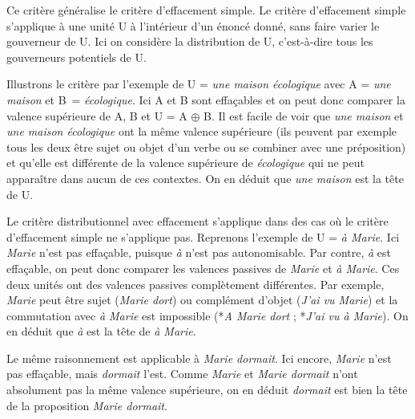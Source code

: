 Ce critère généralise le critère d’effacement simple. Le critère d’effacement simple s’applique à une unité U à l’intérieur d’un énoncé donné, sans faire varier le gouverneur de U. Ici on considère la distribution de U, c’est-à-dire tous les gouverneurs potentiels de U.

Illustrons le critère par l’exemple de U = \textit{une maison écologique} avec A = \textit{une maison} et B~= \textit{écologique}. Ici A et B sont effaçables et on peut donc comparer la valence supérieure de A, B et U = A ${\oplus}$ B. Il est facile de voir que \textit{une maison} et \textit{une maison écologique} ont la même valence supérieure (ils peuvent par exemple tous les deux être sujet ou objet d’un verbe ou se combiner avec une préposition) et qu’elle est différente de la valence supérieure de \textit{écologique} qui ne peut apparaître dans aucun de ces contextes. On en déduit que \textit{une maison} est la tête de U.

Le critère distributionnel avec effacement s’applique dans des cas où le critère d’effacement simple ne s’applique pas. Reprenons l’exemple de U = \textit{à Marie}. Ici \textit{Marie} n’est pas effaçable, puisque \textit{à} n’est pas autonomisable. Par contre, \textit{à} est effaçable, on peut donc comparer les valences passives de \textit{Marie} et \textit{à Marie}. Ces deux unités ont des valences passives complètement différentes. Par exemple, \textit{Marie} peut être sujet (\textit{Marie dort}) ou complément d’objet (\textit{J’ai vu Marie}) et la commutation avec \textit{à Marie} est impossible (*\textit{A Marie dort} ; *\textit{J’ai vu à Marie}). On en déduit que \textit{à} est la tête de \textit{à Marie}.

Le même raisonnement est applicable à \textit{Marie dormait}. Ici encore, \textit{Marie} n’est pas effaçable, mais \textit{dormait} l’est. Comme \textit{Marie} et \textit{Marie dormait} n’ont absolument pas la même valence supérieure, on en déduit \textit{dormait} est bien la tête de la proposition \textit{Marie dormait}.

